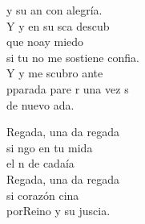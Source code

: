 \begin{cancion}[Regalada][Ixcís]
	y su an con alegría.\\
	\jump
	Y y en su sca descub \\
	que noay miedo\\
	si tu no me sostiene confia.\\
	Y y me scubro ante \\
	pparada pare r una vez s \\
	de nuevo ada.\jump\\
	\begin{chorus}%
		Regada, una da regada\\
		si ngo en tu mida \\
		el n de cadaía\\
		Regada, una da regada\\
		si  corazón cina \\
		porReino y su juscia.\jump\\
	\end{chorus}%
\end{cancion}%
